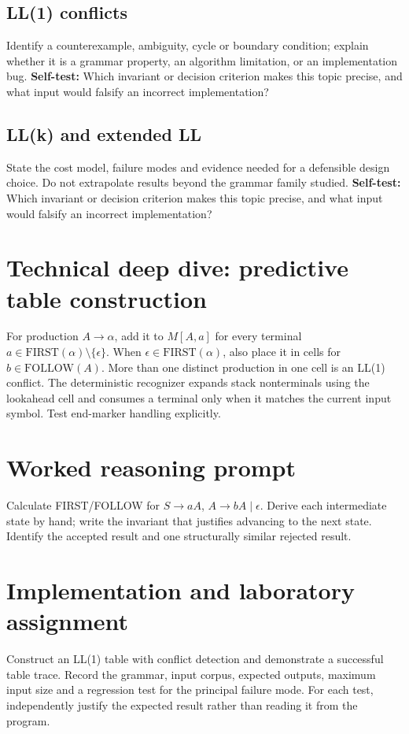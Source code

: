 \documentclass[11pt,letterpaper]{article}
\begin{document}
\subsection{LL(1) conflicts}
Identify a counterexample, ambiguity, cycle or boundary condition; explain whether it is a grammar property, an algorithm limitation, or an implementation bug.
\textbf{Self-test:} Which invariant or decision criterion makes this topic precise, and what input would falsify an incorrect implementation?
\subsection{LL(k) and extended LL}
State the cost model, failure modes and evidence needed for a defensible design choice. Do not extrapolate results beyond the grammar family studied.
\textbf{Self-test:} Which invariant or decision criterion makes this topic precise, and what input would falsify an incorrect implementation?
\section{Technical deep dive: predictive table construction}
For production $A\to\alpha$, add it to $M[A,a]$ for every terminal $a\in \mathrm{FIRST}(\alpha)\setminus\{\epsilon\}$. When $\epsilon\in\mathrm{FIRST}(\alpha)$, also place it in cells for $b\in\mathrm{FOLLOW}(A)$. More than one distinct production in one cell is an LL(1) conflict. The deterministic recognizer expands stack nonterminals using the lookahead cell and consumes a terminal only when it matches the current input symbol. Test end-marker handling explicitly.
\section{Worked reasoning prompt}
Calculate FIRST/FOLLOW for $S\to aA$, $A\to bA\mid\epsilon$. Derive each intermediate state by hand; write the invariant that justifies advancing to the next state. Identify the accepted result and one structurally similar rejected result.
\section{Implementation and laboratory assignment}
Construct an LL(1) table with conflict detection and demonstrate a successful table trace. Record the grammar, input corpus, expected outputs, maximum input size and a regression test for the principal failure mode. For each test, independently justify the expected result rather than reading it from the program.
\end{document}
